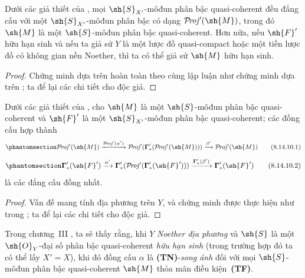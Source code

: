 \documentclass[oneside,10pt]{amsart}
\def\shProj{\mathcal{P}\!\mathit{roj}}
\newcommand{\oldpage}[2][]{\marginnote{\normalfont\footnotesize\textbf{#1}~|~#2}\ignorespaces}
\let\EGAOriginalLabel\label
\renewcommand{\label}[1]{\phantomsection\EGAOriginalLabel{#1}}
\begin{document}
\begin{corollary}[8.14.9]
\label{II.8.14.9}
Dưới các giả thiết của , mọi $\sh{S}_{X'}$-môđun phân bậc quasi-coherent đều đẳng cấu với một $\sh{S}_{X'}$-môđun phân bậc có dạng $\shProj'(\sh{M})$, trong đó $\sh{M}$ là một $\sh{S}$-môđun phân bậc quasi-coherent.
Hơn nữa, nếu $\sh{F}'$ hữu hạn sinh và nếu ta giả sử $Y$ là một lược đồ quasi-compact hoặc một tiền lược đồ có không gian nền Noether, thì ta có thể giả sử $\sh{M}$ hữu hạn sinh.
\end{corollary}

\begin{proof}
Chứng minh dựa trên  hoàn toàn theo cùng lập luận như chứng minh  dựa trên ; ta để lại các chi tiết cho độc giả.
\end{proof}

\begin{proposition}[8.14.10]
\label{II.8.14.10}
Dưới các giả thiết của , cho $\sh{M}$ là một $\sh{S}$-môđun phân bậc quasi-coherent và $\sh{F}'$ là một $\sh{S}_{X'}$-môđun phân bậc quasi-coherent;
các đồng cấu hợp thành
\[
\label{II.8.14.10.1}
    \shProj'(\sh{M})
    \xrightarrow{\shProj'(\alpha')}
    \shProj'(\boldsymbol{\Gamma}'_*(\shProj'(\sh{M})))
    \xrightarrow{\beta'}
    \shProj'(\sh{M})
\tag{8.14.10.1}
\]
\[
\label{II.8.14.10.2}
    \boldsymbol{\Gamma}'_*(\sh{F}')
    \xrightarrow{\alpha'}
    \boldsymbol{\Gamma}'_*(\shProj'(\boldsymbol{\Gamma}'_*(\sh{F}')))
    \xrightarrow{\boldsymbol{\Gamma}'_*(\beta')}
    \boldsymbol{\Gamma}'_*(\sh{F}')
\tag{8.14.10.2}
\]
là các đẳng cấu đồng nhất.
\end{proposition}

\begin{proof}
Vấn đề mang tính địa phương trên $Y$, và chứng minh được thực hiện như trong ;
ta để lại các chi tiết cho độc giả.
\end{proof}

\begin{remark}[8.14.11]
\label{II.8.14.11}
Trong chương~III , ta sẽ thấy rằng, khi $Y$ \emph{Noether địa phương} và $\sh{S}$ là một $\sh{O}_Y$-đại số phân bậc quasi-coherent \emph{hữu hạn sinh} (trong trường hợp đó
\oldpage[II]{201}
ta có thể lấy $X'=X$), khi đó đồng cấu $\alpha$  là \textbf{(TN)}-\emph{song ánh} đối với mọi $\sh{S}$-môđun phân bậc quasi-coherent $\sh{M}$ thỏa mãn điều kiện~\textbf{(TF)}.
\end{remark}
\end{document}
